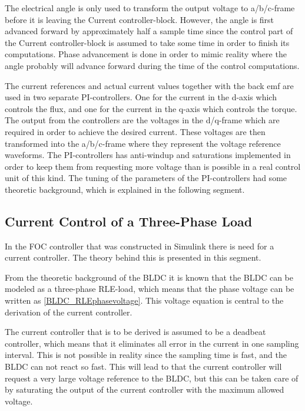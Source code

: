 \documentclass{LTHthesis}
\begin{document}
The electrical angle is only used to transform the output voltage to a/b/c-frame before it is leaving the Current controller-block. However, the angle is first advanced forward by approximately half a sample time since the control part of the Current controller-block is assumed to take some time in order to finish its computations. Phase advancement is done in order to mimic reality where the angle probably will advance forward during the time of the control computations.

The current references and actual current values together with the back emf are used in two separate PI-controllers. One for the current in the d-axis which controls the flux, and one for the current in the q-axis which controls the torque. The output from the controllers are the voltages in the d/q-frame which are required in order to achieve the desired current. These voltages are then transformed into the a/b/c-frame where they represent the voltage reference waveforms. The PI-controllers has anti-windup and saturations implemented in order to keep them from requesting more voltage than is possible in a real control unit of this kind. The tuning of the parameters of the PI-controllers had some theoretic background, which is explained in the following segment.
\subsection{Current Control of a Three-Phase Load}
In the FOC controller that was constructed in Simulink there is need for a current controller. The theory behind this is presented in this segment.

From the theoretic background of the BLDC it is known that the BLDC can be modeled as a three-phase RLE-load, which means that the phase voltage can be written as \eqref{BLDC_RLEphasevoltage}. This voltage equation is central to the derivation of the current controller.

The current controller that is to be derived is assumed to be a deadbeat controller, which means that it eliminates all error in the current in one sampling interval. This is not possible in reality since the sampling time is fast, and the BLDC can not react so fast. This will lead to that the current controller will request a very large voltage reference to the BLDC, but this can be taken care of by saturating the output of the current controller with the maximum allowed voltage. 
\end{document}
